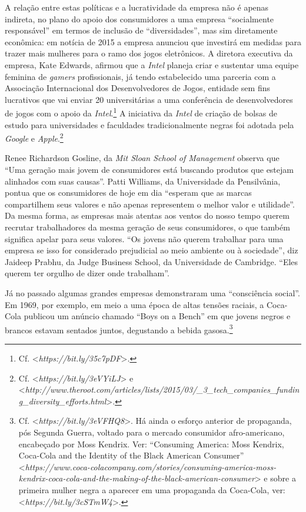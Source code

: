A relação entre estas políticas e a lucratividade da empresa não é
apenas indireta, no plano do apoio dos consumidores a uma empresa
``socialmente responsável'' em termos de inclusão de ``diversidades'',
mas sim diretamente econômica: em notícia de 2015 a empresa anunciou que
investirá em medidas para trazer mais mulheres para o ramo dos jogos
eletrônicos. A diretora executiva da empresa, Kate Edwards, afirmou que
a \emph{Intel} planeja criar e sustentar uma equipe feminina de
\emph{gamers} profissionais, já tendo estabelecido uma parceria com a
Associação Internacional dos Desenvolvedores de Jogos, entidade sem fins
lucrativos que vai enviar 20 universitárias a uma conferência de
desenvolvedores de jogos com o apoio da \emph{Intel}.\footnote{Cf.
  \textless{}\emph{https://bit.ly/35c7pDF}\textgreater{}.}
A iniciativa da \emph{Intel} de criação de bolsas de estudo para
universidades e faculdades tradicionalmente negras foi adotada pela
\emph{Google} e \emph{Apple}.\footnote{Cf.
  \textless{}\emph{https://bit.ly/3eVYiLJ}\textgreater{}
  e \textless{}\emph{http://www.theroot.com/articles/lists/2015/03/\_3\_tech\_companies\_funding\_diversity\_efforts.html}\textgreater{}.}

Renee Richardson Gosline, da \emph{Mit Sloan School of Management}
observa que ``Uma geração mais jovem de consumidores está buscando
produtos que estejam alinhados com suas causas''. Patti Williams, da
Universidade da Pensilvânia, pontua que os consumidores de hoje em dia
``esperam que as marcas compartilhem seus valores e não apenas
representem o melhor valor e utilidade''. Da mesma forma, as empresas
mais atentas aos ventos do nosso tempo querem recrutar trabalhadores da
mesma geração de seus consumidores, o que também significa apelar para
seus valores. ``Os jovens não querem trabalhar para uma empresa se isso
for considerado prejudicial ao meio ambiente ou à sociedade'', diz
Jaideep Prabhu, da Judge Business School, da Universidade de Cambridge.
``Eles querem ter orgulho de dizer onde trabalham''.

Já no passado algumas grandes empresas demonstraram uma ``consciência
social''. Em 1969, por exemplo, em meio a uma época de altas tensões
raciais, a Coca-Cola publicou um anúncio chamado ``Boys on a Bench'' em
que jovens negros e brancos estavam sentados juntos, degustando a bebida
gasosa.\footnote{Cf.
  \textless{}\emph{https://bit.ly/3eVFHQ8}\textgreater{}.
  Há ainda o esforço anterior de propaganda, pós Segunda Guerra, voltado
  para o mercado consumidor afro-americano, encabeçado por Moss Kendrix.
  Ver: ``Consuming America: Moss Kendrix, Coca-Cola and the Identity of
  the Black American Consumer''
  \textless{}\emph{https://www.coca-colacompany.com/stories/consuming-america-moss-kendrix-coca-cola-and-the-making-of-the-black-american-consumer}\textgreater{}
  e sobre a primeira mulher negra a aparecer em uma propaganda da
  Coca-Cola, ver:
  \textless{}\emph{https://bit.ly/3cSTmW4}\textgreater{}.}

